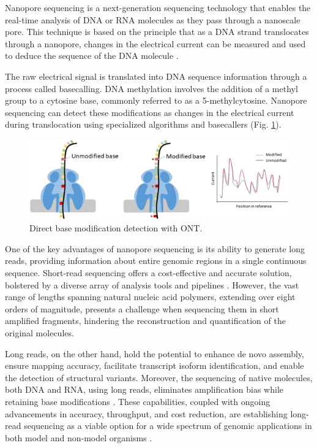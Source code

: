 Nanopore sequencing is a next-generation sequencing technology that enables the real-time analysis of DNA or RNA molecules as they pass through a nanoscale pore. This technique is based on the principle that as a DNA strand translocates through a nanopore, changes in the electrical current can be measured and used to deduce the sequence of the DNA molecule \cite{ont}. 

The raw electrical signal is translated into DNA sequence information through a process called basecalling. DNA methylation involves the addition of a methyl group to a cytosine base, commonly referred to as a 5-methylcytosine. Nanopore sequencing can detect these modifications as changes in the electrical current during translocation using specialized algorithms and basecallers (Fig. \ref{ont_epi}).

\begin{figure}[ht]
	\begin{center}
		\includegraphics[width = \textwidth]{Fig/ont_epi.png}
	\end{center}
	\caption{Direct base modification detection with \ac{ONT}.}\label{ont_epi}
\end{figure}

One of the key advantages of nanopore sequencing is its ability to generate long reads, providing information about entire genomic regions in a single continuous sequence. Short-read sequencing offers a cost-effective and accurate solution, bolstered by a diverse array of analysis tools and pipelines \citep{short_reads}. However, the vast range of lengths spanning natural nucleic acid polymers, extending over eight orders of magnitude, presents a challenge when sequencing them in short amplified fragments, hindering the reconstruction and quantification of the original molecules. 

Long reads, on the other hand, hold the potential to enhance de novo assembly, ensure mapping accuracy, facilitate transcript isoform identification, and enable the detection of structural variants. Moreover, the sequencing of native molecules, both DNA and RNA, using long reads, eliminates amplification bias while retaining base modifications \citep{long_read_adv}. These capabilities, coupled with ongoing advancements in accuracy, throughput, and cost reduction, are establishing long-read sequencing as a viable option for a wide spectrum of genomic applications in both model and non-model organisms \citep{long_read_adv2}.

